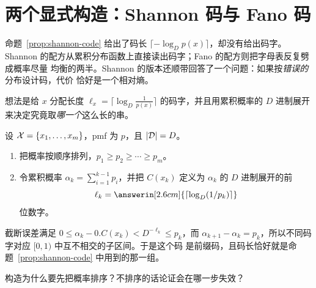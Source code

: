 \section{两个显式构造：Shannon 码与 Fano 码}\label{sec:shannon-fano}
\quad{}

\begin{strand}
命题~\ref{prop:shannon-code} 给出了码长 $\lceil-\log_Dp(x)\rceil$，却没有给出码字。
Shannon 的配方从累积分布函数上直接读出码字；Fano 的配方则把字母表反复劈成概率尽量
均衡的两半。Shannon 的版本还顺带回答了一个问题：如果按\emph{错误的}分布设计码，代价
恰好是一个相对熵。
\end{strand}



想法是给 $x$ 分配长度 $\ell_x=\lceil\log_D\frac1{p(x)}\rceil$ 的码字，并且用累积概率的
$D$ 进制展开来决定究竟取\emph{哪一个}这么长的串。

\begin{definition}[Shannon 码]\label{def:shannon-code-construction}
设 $\mathcal{X}=\{x_1,\ldots,x_m\}$，pmf 为 $p$，且 $|\mathcal{D}|=D$。
\begin{enumerate}
  \item 把概率按顺序排列，$p_1\ge p_2\ge\cdots\ge p_m$。
  \item 令累积概率 $\alpha_k=\sum_{i=1}^{k-1}p_i$，并把 $C(x_k)$ 定义为 $\alpha_k$ 的
  $D$ 进制展开的前
  \[
    \ell_k=\answerin[2.6cm]{\lceil\log_D(1/p_k)\rceil}
  \]
  位数字。
\end{enumerate}
\end{definition}

截断误差满足 $0\le\alpha_k-0.C(x_k)<D^{-\ell_k}\le p_k$，而
$\alpha_{k+1}-\alpha_k=p_k$，所以不同码字对应 $[0,1)$ 中互不相交的子区间。于是这个码
是前缀码，且码长恰好就是命题~\ref{prop:shannon-code} 中用到的那一组。

\begin{yourturn}
构造为什么要先把概率排序？不排序的话论证会在哪一步失效？
\ifshowanswers\else\workspace[2]\fi
{}
\end{yourturn}

